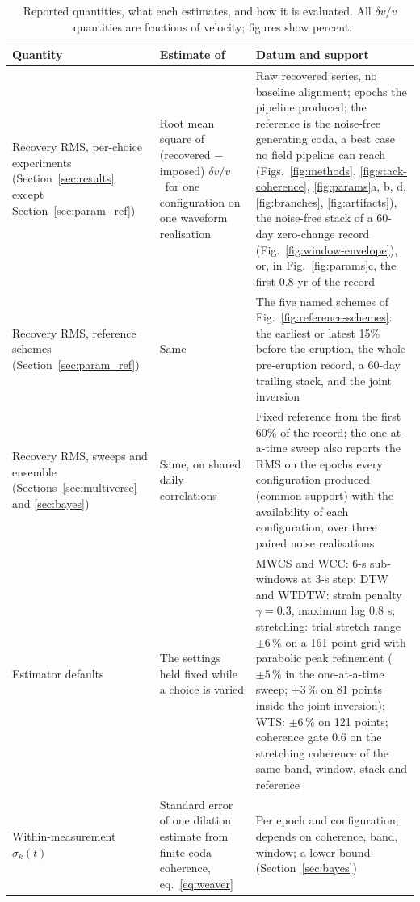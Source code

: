 \documentclass[
  referee]{gji}
\providecommand{\dvv}{\ensuremath{\delta v/v}}
\begin{document}
\begin{table}
\footnotesize
\caption{Reported quantities, what each estimates, and how it is evaluated.
All \dvv\ quantities are fractions of velocity; figures show percent.}
\label{tab:estimands}
\begin{tabularx}{\textwidth}{@{}>{\raggedright\arraybackslash}p{3.1cm} L L@{}}
\toprule
\textbf{Quantity} & \textbf{Estimate of} & \textbf{Datum and support} \\
\midrule
Recovery RMS, per-choice experiments (Section~\ref{sec:results} except
Section~\ref{sec:param_ref}) & Root mean square of (recovered $-$ imposed)
\dvv\ for one configuration on one waveform realisation & Raw recovered
series, no baseline alignment; epochs the pipeline produced; the reference
is the noise-free generating coda, a best case no field pipeline can reach
(Figs.~\ref{fig:methods}, \ref{fig:stack-coherence},
\ref{fig:params}a, b, d, \ref{fig:branches}, \ref{fig:artifacts}), the
noise-free stack of a 60-day zero-change record (Fig.~\ref{fig:window-envelope}),
or, in Fig.~\ref{fig:params}c, the first 0.8 yr of the record \\ \hline
Recovery RMS, reference schemes (Section~\ref{sec:param_ref}) & Same &
The five named schemes of Fig.~\ref{fig:reference-schemes}: the earliest or
latest 15\% before the eruption, the whole pre-eruption record, a 60-day
trailing stack, and the joint inversion \\ \hline
Recovery RMS, sweeps and ensemble (Sections~\ref{sec:multiverse} and
\ref{sec:bayes}) & Same, on shared daily correlations & Fixed reference from
the first 60\% of the record; the one-at-a-time sweep also reports the RMS
on the epochs every configuration produced (common support) with the
availability of each configuration, over three paired noise realisations
\\ \hline
Estimator defaults & The settings held fixed while a choice is varied & MWCS
and WCC: 6-s sub-windows at 3-s step; DTW and WTDTW: strain penalty
$\gamma=0.3$, maximum lag 0.8 s; stretching: trial stretch range
$\pm6\,\%$ on a 161-point grid with parabolic peak refinement ($\pm5\,\%$
in the one-at-a-time sweep; $\pm3\,\%$ on 81 points inside the joint
inversion); WTS: $\pm6\,\%$ on 121 points; coherence gate 0.6 on the
stretching coherence of the same band, window, stack and reference \\ \hline
Within-measurement $\sigma_k(t)$ & Standard error of one dilation estimate from
finite coda coherence, eq.~\ref{eq:weaver} & Per epoch and configuration;
depends on coherence, band, window; a lower bound (Section~\ref{sec:bayes}) \\ \hline

\end{tabularx}
\end{table}
\end{document}
